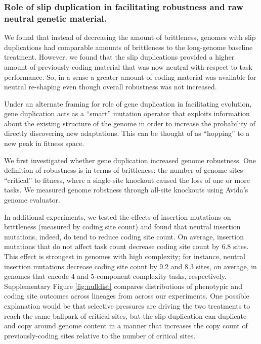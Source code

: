 \subsubsection{Role of slip duplication in facilitating robustness and raw neutral genetic material.}



We found that instead of decreasing the amount of brittleness, genomes with slip duplications had comparable amounts of brittleness to the long-genome baseline treatment.
However, we found that the slip duplications provided a higher amount of previously coding material that was now neutral with respect to task performance.
So, in a sense a greater amount of coding material was available for neutral re-shaping even though overall robustness was not increased.

Under an alternate framing for role of gene duplication in facilitating evolution, gene duplication acts as a ``smart'' mutation operator that exploits information about the existing structure of the genome in order to increase the probability of directly discovering new adaptations.
This can be thought of as ``hopping'' to a new peak in fitness space.

We first investigated whether gene duplication increased genome robustness.
One definition of robustness is in terms of brittleness: the number of genome sites ``critical'' to fitness, where a single-site knockout caused the loss of one or more tasks.
We measured genome robstness through all-site knockouts using Avida's genome evaluator.


In additional experiments, we tested the effects of insertion mutations on brittleness (measured by coding site count) and found that neutral insertion mutations, indeed, do tend to reduce coding site count.
On average, insertion mutations that do not affect task count decrease coding site count by 6.8 sites.
This effect is strongest in genomes with high complexity; for instance, neutral insertion mutations decrease coding site count by 9.2 and 8.3 sites, on average, in genomes that encode 4 and 5-component complexity tasks, respectively.
Supplementary Figure \ref{fig:nulldist} compares distributions of phenotypic and coding site outcomes across lineages from across our experiments.
One possible explanation would be that selective pressures are driving the two treatments to reach the same ballpark of critical sites, but the slip duplication can duplicate and copy around genome content in a manner that increases the copy count of previously-coding sites relative to the number of critical sites.

